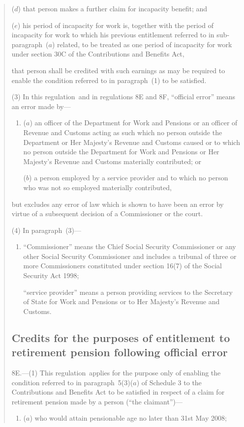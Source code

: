 \documentclass[12pt,a4paper]{article}
\begin{document}
\begin{quotation}
\begin{enumerate}
($d$) that person makes a further claim for incapacity benefit; and

($e$) his period of incapacity for work is, together with the period of incapacity for work to which his previous entitlement referred to in sub-paragraph~($a$)  related, to be treated as one period of incapacity for work under section 30C of the Contributions and Benefits Act,
\end{enumerate}
that person shall be credited with such earnings as may be required to enable the condition referred to in paragraph~(1) to be satisfied.

(3) In this regulation~and in regulations 8E and 8F, “official error” means an error made by—
\begin{enumerate}\item[]
($a$) an officer of the Department for Work and Pensions or an officer of Revenue and Customs acting as such which no person outside the Department or Her Majesty’s Revenue and Customs caused or to which no person outside the Department for Work and Pensions or Her Majesty’s Revenue and Customs materially contributed; or

($b$) a person employed by a service provider and to which no person who was not so employed materially contributed,
\end{enumerate}
but excludes any error of law which is shown to have been an error by virtue of a subsequent decision of a Commissioner or the court.

(4) In paragraph~(3)—
\begin{enumerate}\item[]
“Commissioner” means the Chief Social Security Commissioner or any other Social Security Commissioner and includes a tribunal of three or more Commissioners constituted under section 16(7) of the Social Security Act 1998;

“service provider” means a person providing services to the Secretary of State for Work and Pensions or to Her Majesty’s Revenue and Customs.
\end{enumerate}

\subsection*{Credits for the purposes of entitlement to retirement pension following official error}

8E.---(1)  This regulation~applies for the purpose only of enabling the condition referred to in paragraph~5(3)($a$)  of Schedule 3 to the Contributions and Benefits Act to be satisfied in respect of a claim for retirement pension made by a person (“the claimant”)—
\begin{enumerate}\item[]
($a$) who would attain pensionable age no later than 31st May 2008;


\end{enumerate}
\end{quotation}
\end{document}
